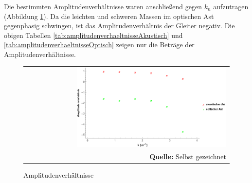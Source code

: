 \documentclass[a4paper,titlepage]{scrartcl}
\numberwithin{equation}{section}
\begin{document}
Die bestimmten Amplitudenverhältnisse waren anschließend gegen $k_n$ aufzutragen (Abbildung \ref{fig:amplitudenverhaeltnisse}). Da die leichten und schweren Massen im optischen Ast gegenphasig schwingen, ist das Amplitudenverhältnis der Gleiter negativ. Die obigen Tabellen \ref{tab:amplitudenverhaeltnisseAkustisch} und \ref{tab:amplitudenverhaeltnisseOptisch} zeigen nur die Beträge der Amplitudenverhältnisse.
\begin{figure}[H]
	\centering
	\begin{tabular}{@{}r@{}}
		\includegraphics[width=0.75\textwidth]{amplitudenverhaeltnis.png}\\
		\footnotesize\sffamily\textbf{Quelle:} Selbst gezeichnet
	\end{tabular}
	\caption{Amplitudenverhältnisse}
    \label{fig:amplitudenverhaeltnisse}
\end{figure}
\end{document}
